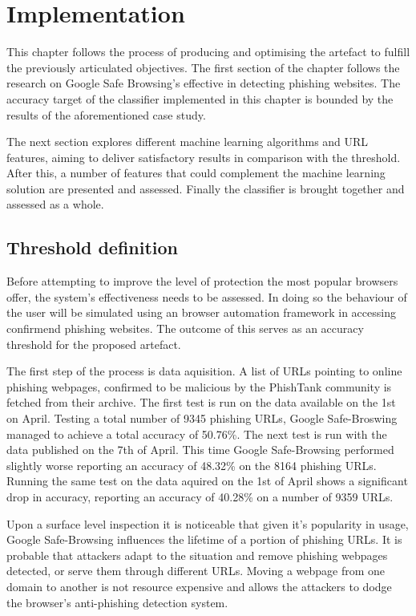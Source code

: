 
\chapter{Implementation}
This chapter follows the process of producing and optimising the artefact to fulfill the previously articulated objectives. The first section of the chapter follows the research on Google Safe Browsing's effective in detecting phishing websites. The accuracy target of the classifier implemented in this chapter is bounded by the results of the aforementioned case study.

The next section explores different machine learning algorithms and URL features, aiming to deliver satisfactory results in comparison with the threshold. After this, a number of features that could complement the machine learning solution are presented and assessed. Finally the classifier is brought together and assessed as a whole.

\section{Threshold definition}
Before attempting to improve the level of protection the most popular browsers offer, the system's effectiveness needs to be assessed. In doing so the behaviour of the user will be simulated using an browser automation framework in accessing confirmend phishing websites. The outcome of this serves as an accuracy threshold for the proposed artefact.

The first step of the process is data aquisition. A list of URLs pointing to online phishing webpages, confirmed to be malicious by the PhishTank community is fetched from their archive. The first test is run on the data available on the 1st on April. Testing a total number of 9345 phishing URLs, Google Safe-Broswing managed to achieve a total accuracy of 50.76\%.
The next test is run with the data published on the 7th of April. This time Google Safe-Browsing performed slightly worse reporting an accuracy of 48.32\% on the 8164 phishing URLs. Running the same test on the data aquired on the 1st of April shows a significant drop in accuracy, reporting an accuracy of 40.28\% on a number of 9359 URLs.

Upon a surface level inspection it is noticeable that given it's popularity in usage, Google Safe-Browsing influences the lifetime of a portion of phishing URLs. It is probable that attackers adapt to the situation and remove phishing webpages detected, or serve them through different URLs. Moving a webpage from one domain to another is not resource expensive and allows the attackers to dodge the browser's anti-phishing detection system.

